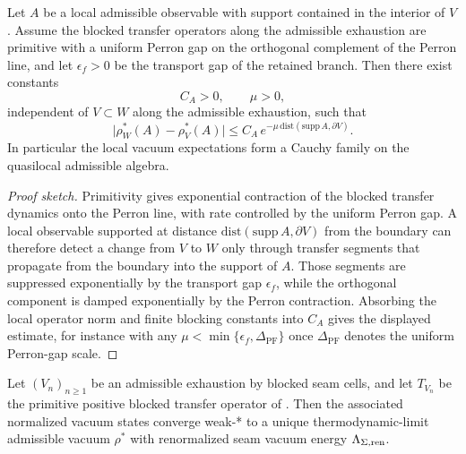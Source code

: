 \begin{lemma}
\label{lem:boundary-decoupling-admissible}
Let $A$ be a local admissible observable with support contained in the interior of $V$. Assume the
blocked transfer operators along the admissible exhaustion are primitive with a uniform Perron gap
on the orthogonal complement of the Perron line, and let $\epsilon_f>0$ be the transport gap of the
retained branch. Then there exist constants
\[
C_A>0,
\qquad
\mu>0,
\]
independent of $V\subset W$ along the admissible exhaustion, such that
\[
\bigl|\rho_W^\ast(A)-\rho_V^\ast(A)\bigr|
\le
C_A\,e^{-\mu\,\mathrm{dist}(\mathrm{supp}\,A,\partial V)}.
\]
In particular the local vacuum expectations form a Cauchy family on the quasilocal admissible
algebra.
\end{lemma}

\begin{proof}[Proof sketch]
Primitivity gives exponential contraction of the blocked transfer dynamics onto the Perron line,
with rate controlled by the uniform Perron gap. A local observable supported at distance
$\mathrm{dist}(\mathrm{supp}\,A,\partial V)$ from the boundary can therefore detect a change from
$V$ to $W$ only through transfer segments that propagate from the boundary into the support of $A$.
Those segments are suppressed exponentially by the transport gap $\epsilon_f$, while the orthogonal
component is damped exponentially by the Perron contraction. Absorbing the local operator norm and
finite blocking constants into $C_A$ gives the displayed estimate, for instance with any
$\mu<\min\{\epsilon_f,\Delta_{\mathrm{PF}}\}$ once $\Delta_{\mathrm{PF}}$ denotes the uniform
Perron-gap scale.
\end{proof}

\begin{theorem}
\label{thm:thermodynamic-limit}
Let $(V_n)_{n\ge1}$ be an admissible exhaustion by blocked seam cells, and let $T_{V_n}$ be the
primitive positive blocked transfer operator of . Then the
associated normalized vacuum states converge weak-* to a unique thermodynamic-limit admissible
vacuum $\rho^\ast$ with renormalized seam vacuum energy $\Lambda_{\Sigma,\mathrm{ren}}$.
\end{theorem}

